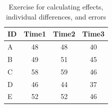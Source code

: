 \begin{table}[ht]
	\centering
	\caption{Exercise for calculating effects, individual differences, and errors}
	\begin{tabular}{l|ccc}
		\hline
		ID & Time1 & Time2 & Time3 \\
		\hline
		A  & 48    & 48    & 40    \\
		B  & 49    & 51    & 45    \\
		C  & 58    & 59    & 46    \\
		D  & 46    & 44    & 37    \\
		E  & 52    & 52    & 46    \\
		\hline
	\end{tabular}
	\label{m14_example}
\end{table}
